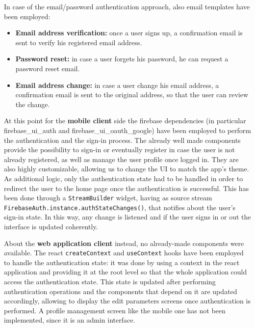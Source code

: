 \noindent In case of the email/password authentication approach, also email templates have been employed:
\begin{itemize}[nosep] %
    \item \textbf{Email address verification:} once a user signs up, a confirmation email is sent to verify his registered email address.
    \item \textbf{Password reset:} in case a user forgets his password, he can request a password reset email.
    \item \textbf{Email address change:} in case a user change his email address, a confirmation email is sent to the original address, so that the user can review the change.
\end{itemize}
\newpage
\noindent At this point for the \textbf{mobile client} side the firebase dependencies (in particular firebase\_ui\_auth and firebase\_ui\_oauth\_google) have been employed to perform the authentication and the sign-in process. The already well made components provide the possibility to sign-in or eventually register in case the user is not already registered, as well as manage the user profile once logged in. They are also highly customizable, allowing us to change the UI to match the app's theme. As additional logic, only the authentication state had to be handled in order to redirect the user to the home page once the authentication is successful. This has been done through a \texttt{StreamBuilder} widget, having as source stream \texttt{FirebaseAuth.instance.authStateChanges()}, that notifies about the user's sign-in state. In this way, any change is listened and if the user signs in or out the interface is updated coherently.

\noindent About the \textbf{web application client} instead, no already-made components were available. The react \texttt{createContext} and \texttt{useContext} hooks have been employed to handle the authentication state: it was done by using a context in the react application and providing it at the root level so that the whole application could access the authentication state. This state is updated after performing authentication operations and the components that depend on it are updated accordingly, allowing to display the edit parameters screens once authentication is performed. A profile management screen like the mobile one has not been implemented, since it is an admin interface.   

